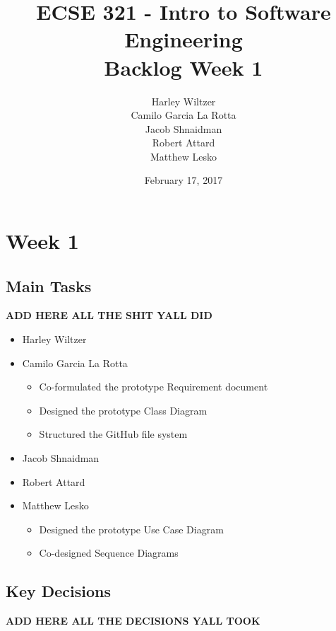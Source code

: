\documentclass[12pt]{article}
\title{ECSE 321 - Intro to Software Engineering\\Backlog Week 1}
\author{Harley Wiltzer\\Camilo Garcia La Rotta\\Jacob Shnaidman\\Robert Attard\\Matthew Lesko}
\date{February 17, 2017}
\begin{document}
\maketitle
\newpage
{} %

\section{Week 1}

\subsection{Main Tasks}

\textbf{ADD HERE ALL THE SHIT YALL DID}

\begin{itemize}
    \item Harley Wiltzer
    \item Camilo Garcia La Rotta
    \begin{itemize}
        \item Co-formulated the prototype Requirement document
        \item Designed the prototype Class Diagram
        \item Structured the GitHub file system
    \end{itemize}
    \item Jacob Shnaidman
    \item Robert Attard
    \item Matthew Lesko
    \begin{itemize}
    	\item Designed the prototype Use Case Diagram
    	\item Co-designed Sequence Diagrams
    \end{itemize}
\end{itemize}

\subsection{Key Decisions}

\textbf{ADD HERE ALL THE DECISIONS YALL TOOK}
\end{document}

